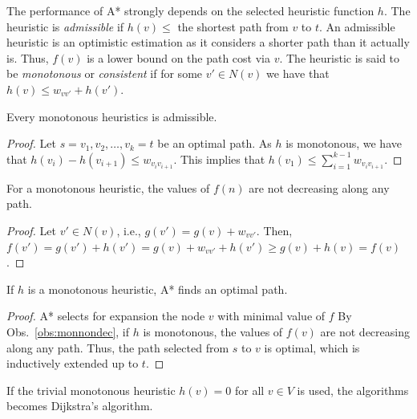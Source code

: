 The performance of A* strongly depends on the selected heuristic function $h$.
The heuristic is \emph{admissible} if $h(v)\leq$ the shortest path from $v$ to $t$.
An admissible heuristic is an optimistic estimation as it considers a shorter path than it actually is. 
Thus, $f(v)$ is a lower bound on the path cost via $v$.
The heuristic is said to be \emph{monotonous} or \emph{consistent} if for some $v'\in N(v)$ we have that $h(v)\leq w_{vv'}+h(v')$.
\begin{observation}
Every monotonous heuristics is admissible.
\end{observation}
\begin{proof}
Let $s=v_1,v_2,\dots,v_k=t$ be an optimal path.
As $h$ is monotonous, we have that $h(v_i)-h(v_{i+1})\leq w_{v_iv_{i+1}}$.
	This implies that $h(v_1)\leq\sum_{i=1}^{k-1}w_{v_iv_{i+1}}$.
\end{proof}
\begin{observation}
For a monotonous heuristic, the values of $f(n)$ are not decreasing along any path.
\end{observation}
\begin{proof}\label{obs:monnondec}
	Let $v'\in N(v)$, i.e., $g(v')=g(v)+w_{vv'}$.
Then, $f(v')=g(v')+h(v')=g(v)+w_{vv'}+h(v')\geq g(v)+h(v)=f(v)$.
\end{proof}
\begin{proposition}
If $h$ is a monotonous heuristic, A* finds an optimal path.
\end{proposition}
\begin{proof}
	A* selects for expansion the node $v$ with minimal value of $f$ 
	By Obs.~\ref{obs:monnondec}, if $h$ is monotonous, the values of $f(v)$ are not decreasing along any path.
	Thus, the path selected from $s$ to $v$ is optimal, which is inductively extended up to $t$.
\end{proof}
If the trivial monotonous heuristic $h(v)=0$ for all $v\in V$ is used, the algorithms becomes Dijkstra's algorithm.

